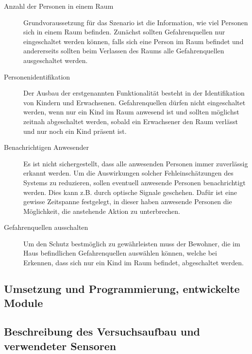 \begin{description}
	\item [Anzahl der Personen in einem Raum] Grundvoraussetzung für das Szenario ist die Information, wie viel Personen sich in einem Raum befinden. Zunächst sollten Gefahrenquellen nur eingeschaltet werden können, falls sich eine Person im Raum befindet und andererseits sollten beim Verlassen des Raums alle Gefahrenquellen ausgeschaltet werden.
	\item [Personenidentifikation] Der Ausbau der erstgenannten Funktionalität besteht in der Identifikation von Kindern und Erwachsenen. Gefahrenquellen dürfen nicht eingeschaltet werden, wenn nur ein Kind im Raum anwesend ist und sollten möglichst zeitnah abgeschaltet werden, sobald ein Erwachsener den Raum verlässt und nur noch ein Kind präsent ist.
	\item [Benachrichtigen Anwesender] Es ist nicht sichergestellt, dass alle anwesenden Personen immer zuverlässig erkannt werden. Um die Auswirkungen solcher Fehleinschätzungen des Systems zu reduzieren, sollen eventuell anwesende Personen benachrichtigt werden. Dies kann z.B. durch optische Signale geschehen. Dafür ist eine gewisse Zeitspanne festgelegt, in dieser haben anwesende Personen die Möglichkeit, die anstehende Aktion zu unterbrechen.
	\item [Gefahrenquellen ausschalten] Um den Schutz bestmöglich zu gewährleisten muss der Bewohner, die im Haus befindlichen Gefahrenquellen auswählen können, welche bei Erkennen, dass sich nur ein Kind im Raum befindet, abgeschaltet werden.
\end{description}

\subsection{Umsetzung und Programmierung, entwickelte Module}
\subsection{Beschreibung des Versuchsaufbau und verwendeter Sensoren}

